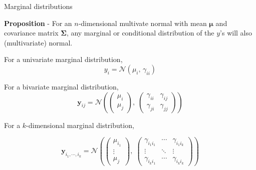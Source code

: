 \documentclass[11pt,ignorenonframetext,]{beamer}
\begin{document}
\begin{frame}{%
\protect\hypertarget{marginal-distributions}{%
Marginal distributions}}

\small

\textbf{Proposition} - For an \(n\)-dimensional multivate normal with
mean \(\symbf{\mu}\) and covariance matrix \(\symbf{\Sigma}\), any
marginal or conditional distribution of the \(y\)’s will also
(multivariate) normal.

\pause

\vspace{2mm}

For a univariate marginal distribution,
\[ y_i = \mathcal{N}(\mu_i,\,\gamma_{ii}) \]

\pause

For a bivariate marginal distribution,
\[ \symbf{y}_{ij} = \mathcal{N}\left( \begin{pmatrix}\mu_i \\ \mu_j \end{pmatrix},\; \begin{pmatrix} \gamma_{ii} & \gamma_{ij} \\ \gamma_{ji} & \gamma_{jj} \end{pmatrix} \right) \]

\pause

For a \(k\)-dimensional marginal distribution,

\[ 
\symbf{y}_{i_1,\cdots,i_k} = 
  \mathcal{N}\left( 
    \begin{pmatrix}\mu_{i_1} \\ \vdots \\ \mu_j \end{pmatrix},\; 
    \begin{pmatrix} 
      \gamma_{i_1i_1}  & \cdots & \gamma_{i_1 i_k} \\ 
      \vdots           & \ddots & \vdots \\
      \gamma_{i_k i_1} & \cdots & \gamma_{i_k i_k} \end{pmatrix} 
  \right) 
\]

\end{frame}
\end{document}
